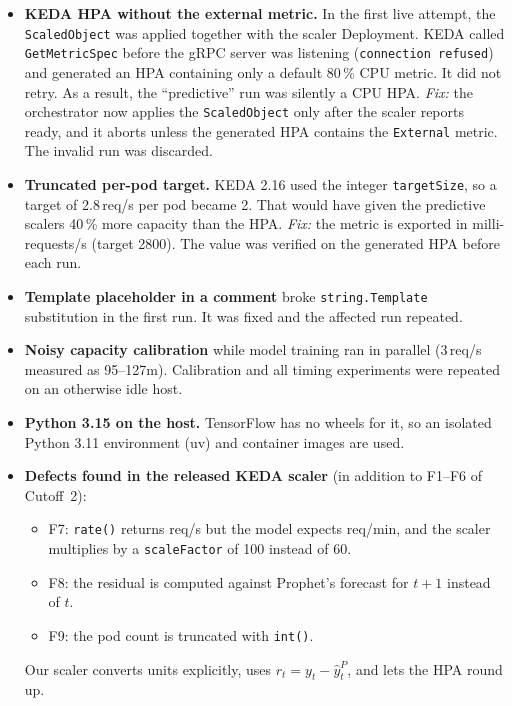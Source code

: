 \documentclass[11pt,a4paper]{article}
\begin{document}
\begin{itemize}
\item \textbf{KEDA HPA without the external metric.} In the first live attempt, the \texttt{ScaledObject} was
      applied together with the scaler Deployment. KEDA called \texttt{GetMetricSpec} before the gRPC server
      was listening (\texttt{connection refused}) and generated an HPA containing only a default 80\,\% CPU
      metric. It did not retry. As a result, the ``predictive'' run was silently a CPU HPA.
      \emph{Fix:} the orchestrator now applies the \texttt{ScaledObject} only after the scaler reports ready, and
      it aborts unless the generated HPA contains the \texttt{External} metric. The invalid run was discarded.
\item \textbf{Truncated per-pod target.} KEDA 2.16 used the integer \texttt{targetSize}, so a target of
      2.8\,req/s per pod became 2. That would have given the predictive scalers 40\,\% more capacity than the
      HPA. \emph{Fix:} the metric is exported in milli-requests/s (target 2800). The value was verified on the
      generated HPA before each run.
\item \textbf{Template placeholder in a comment} broke \texttt{string.Template} substitution in the first run.
      It was fixed and the affected run repeated.
\item \textbf{Noisy capacity calibration} while model training ran in parallel (3\,req/s measured as
      95--127m). Calibration and all timing experiments were repeated on an otherwise idle host.
\item \textbf{Python 3.15 on the host.} TensorFlow has no wheels for it, so an isolated Python 3.11
      environment (uv) and container images are used.
\item \textbf{Defects found in the released KEDA scaler} (in addition to F1--F6 of Cutoff~2):
      \begin{itemize}
      \item F7: \texttt{rate()} returns req/s but the model expects req/min, and the scaler multiplies by a
            \texttt{scaleFactor} of 100 instead of 60.
      \item F8: the residual is computed against Prophet's forecast for $t{+}1$ instead of $t$.
      \item F9: the pod count is truncated with \texttt{int()}.
      \end{itemize}
      Our scaler converts units explicitly, uses $r_t=y_t-\hat y^P_t$, and lets the HPA round up.
\end{itemize}
\end{document}
